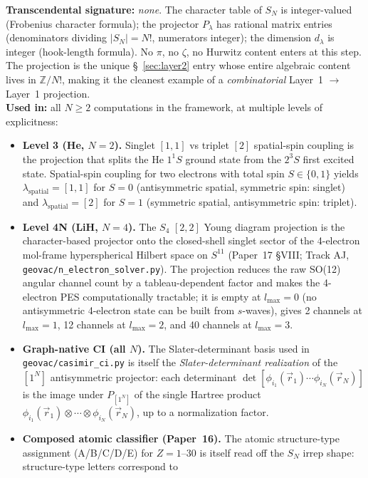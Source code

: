 \textbf{Transcendental signature:} \textit{none}.  The character
table of $S_N$ is integer-valued (Frobenius character formula); the
projector $P_\lambda$ has rational matrix entries (denominators
dividing $|S_N| = N!$, numerators integer); the dimension $d_\lambda$
is integer (hook-length formula).  No $\pi$, no $\zeta$, no Hurwitz
content enters at this step.  The projection is the unique
\S~\ref{sec:layer2} entry whose entire algebraic content lives in
$\mathbb{Z}/N!$, making it the cleanest example of a
\emph{combinatorial} Layer~1 $\to$ Layer~1 projection.\\
\textbf{Used in:} all $N \geq 2$ computations in the framework, at
multiple levels of explicitness:
\begin{itemize}
\item \textbf{Level 3 (He, $N=2$).}  Singlet $[1,1]$ vs triplet $[2]$
spatial-spin coupling is the projection that splits the He $1^1 S$
ground state from the $2^3 S$ first excited state.  Spatial-spin
coupling for two electrons with total spin $S \in \{0, 1\}$ yields
$\lambda_\text{spatial} = [1,1]$ for $S=0$ (antisymmetric spatial,
symmetric spin: singlet) and $\lambda_\text{spatial} = [2]$ for
$S=1$ (symmetric spatial, antisymmetric spin: triplet).
\item \textbf{Level 4N (LiH, $N=4$).}  The $S_4$ $[2,2]$ Young
diagram projection is the character-based projector onto the
closed-shell singlet sector of the 4-electron mol-frame
hyperspherical Hilbert space on $S^{11}$ (Paper~17 §VIII; Track AJ,
\texttt{geovac/n\_electron\_solver.py}).  The projection reduces the
raw SO(12) angular channel count by a tableau-dependent factor and
makes the 4-electron PES computationally tractable; it is empty at
$l_{\max} = 0$ (no antisymmetric 4-electron state can be built from
$s$-waves), gives 2 channels at $l_{\max} = 1$, 12 channels at
$l_{\max} = 2$, and 40 channels at $l_{\max} = 3$.
\item \textbf{Graph-native CI (all $N$).}  The Slater-determinant
basis used in \texttt{geovac/casimir\_ci.py} is itself the
\emph{Slater-determinant realization} of the $[1^N]$ antisymmetric
projector: each determinant
$\det[\phi_{i_1}(\vec{r}_1)\cdots\phi_{i_N}(\vec{r}_N)]$ is the
image under $P_{[1^N]}$ of the single Hartree product
$\phi_{i_1}(\vec{r}_1)\otimes\cdots\otimes\phi_{i_N}(\vec{r}_N)$,
up to a normalization factor.
\item \textbf{Composed atomic classifier (Paper~16).}  The atomic
structure-type assignment (A/B/C/D/E) for $Z = 1$--$30$ is itself
read off the $S_N$ irrep shape: structure-type letters correspond to

\end{itemize}
